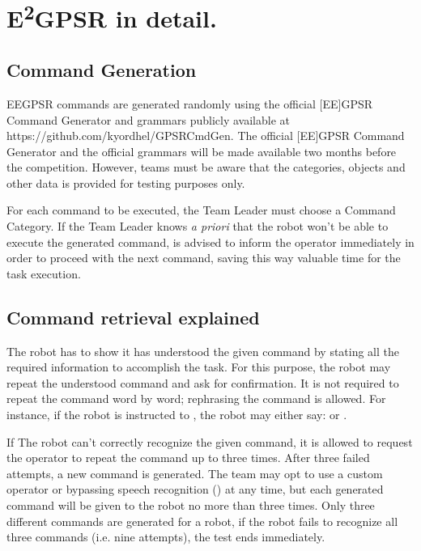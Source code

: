 \chapter[EEGPSR in detail]{E\textsuperscript{2}GPSR in detail.}
\label{chap:eegpsr-appendix}

\section{Command Generation}
EEGPSR commands are generated randomly using the official [EE]GPSR Command Generator and grammars publicly available at https://github.com/kyordhel/GPSRCmdGen. The official [EE]GPSR Command Generator and the official grammars will be made available two months before the competition. However, teams must be aware that the categories, objects and other data is provided for testing purposes only.

For each command to be executed, the Team Leader must choose a Command Category. If the Team Leader knows \textit{a priori} that the robot won't be able to execute the generated command, is advised to inform the operator immediately in order to proceed with the next command, saving this way valuable time for the task execution.


\section{Command retrieval explained}
The robot has to show it has understood the given command by stating all the required information to accomplish the task. For this purpose, the robot may repeat the understood command and ask for confirmation. It is not required to repeat the command word by word; rephrasing the command is allowed. For instance, if the robot is instructed to , the robot may either say: \textit{} or \textit{}.

If The robot can't correctly recognize the given command, it is allowed to request the operator to repeat the command up to three times. After three failed attempts, a new command is generated. The team may opt to use a custom operator or bypassing speech recognition () at any time, but each generated command will be given to the robot no more than three times. Only three different commands are generated for a robot, if the robot fails to recognize all three commands (i.e. nine attempts), the test ends immediately.

